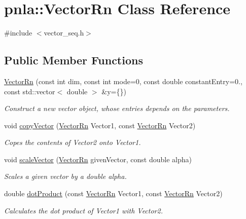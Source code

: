 \hypertarget{classpnla_1_1VectorRn}{}\section{pnla\+:\+:Vector\+Rn Class Reference}
\label{classpnla_1_1VectorRn}


{\ttfamily \#include $<$vector\+\_\+seq.\+h$>$}

\subsection*{Public Member Functions}
\begin{DoxyCompactItemize}
\item 
\mbox{\hyperlink{classpnla_1_1VectorRn_abd7ba1abf8c8943bd1ad2f00eb8f5388}{Vector\+Rn}} (const int dim, const int mode=0, const double constant\+Entry=0., const std\+::vector$<$ double $>$ \&y=\{\})
\begin{DoxyCompactList}\small\item\em Construct a new vector object, whose entries depends on the parameters. \end{DoxyCompactList}\item 
void \mbox{\hyperlink{classpnla_1_1VectorRn_a1618d4527ffb8c189e5136269bcfee69}{copy\+Vector}} (\mbox{\hyperlink{classpnla_1_1VectorRn}{Vector\+Rn}} Vector1, const \mbox{\hyperlink{classpnla_1_1VectorRn}{Vector\+Rn}} Vector2)
\begin{DoxyCompactList}\small\item\em Copes the contents of \textquotesingle{}Vector2\textquotesingle{} onto \textquotesingle{}Vector1\textquotesingle{}. \end{DoxyCompactList}\item 
void \mbox{\hyperlink{classpnla_1_1VectorRn_a714193738ca2ff902d6a7165eeabc15f}{scale\+Vector}} (\mbox{\hyperlink{classpnla_1_1VectorRn}{Vector\+Rn}} given\+Vector, const double alpha)
\begin{DoxyCompactList}\small\item\em Scales a given vector by a double \textquotesingle{}alpha\textquotesingle{}. \end{DoxyCompactList}\item 
double \mbox{\hyperlink{classpnla_1_1VectorRn_a70c593f6a54a97cbdcab7bad1da3b6f0}{dot\+Product}} (const \mbox{\hyperlink{classpnla_1_1VectorRn}{Vector\+Rn}} Vector1, const \mbox{\hyperlink{classpnla_1_1VectorRn}{Vector\+Rn}} Vector2)
\begin{DoxyCompactList}\small\item\em Calculates the dot product of \textquotesingle{}Vector1\textquotesingle{} with \textquotesingle{}Vector2\textquotesingle{}. \end{DoxyCompactList}\item 

\end{DoxyCompactItemize}
